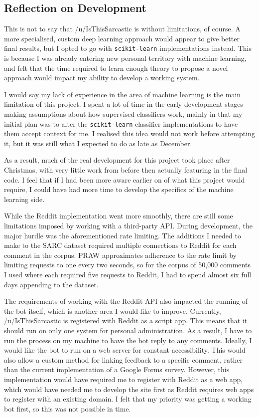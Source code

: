 \documentclass[a4paper,12pt]{article}
\begin{document}
\subsection{Reflection on Development}
This is not to say that /u/IsThisSarcastic is without limitations, of course. A more specialised, custom deep learning approach would appear to give better final results, but I opted to go with \texttt{scikit-learn} implementations instead. This is because I was already entering new personal territory with machine learning, and felt that the time required to learn enough theory to propose a novel approach would impact my ability to develop a working system.

I would say my lack of experience in the area of machine learning is the main limitation of this project. I spent a lot of time in the early development stages making assumptions about how supervised classifiers work, mainly in that my initial plan was to alter the \texttt{scikit-learn} classifier implementations to have them accept context for me. I realised this idea would not work before attempting it, but it was still what I expected to do as late as December.

As a result, much of the real development for this project took place after Christmas, with very little work from before then actually featuring in the final code. I feel that if I had been more aware earlier on of what this project would require, I could have had more time to develop the specifics of the machine learning side.

While the Reddit implementation went more smoothly, there are still some limitations imposed by working with a third-party API. During development, the major hurdle was the aforementioned rate limiting. The additions I needed to make to the SARC dataset required multiple connections to Reddit for each comment in the corpus. PRAW approximates adherence to the rate limit by limiting requests to one every two seconds, so for the corpus of 50,000 comments I used where each required five requests to Reddit, I had to spend almost six full days appending to the dataset.

The requirements of working with the Reddit API also impacted the running of the bot itself, which is another area I would like to improve. Currently, /u/IsThisSarcastic is registered with Reddit as a script app. This means that it should run on only one system for personal administration. As a result, I have to run the process on my machine to have the bot reply to any comments. Ideally, I would like the bot to run on a web server for constant accessibility. This would also allow a custom method for linking feedback to a specific comment, rather than the current implementation of a Google Forms survey. However, this implementation would have required me to register with Reddit as a web app, which would have needed me to develop the site first as Reddit requires web apps to register with an existing domain. I felt that my priority was getting a working bot first, so this was not possible in time.
\end{document}
